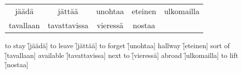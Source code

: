 \begin{center}
  \begin{tabular}{|c c c c c|}
    \hline
    jäädä & jättää & unohtaa & eteinen & ulkomailla \\
    tavallaan & tavattavissa & vieressä & nostaa & \\
    \hline
  \end{tabular}
\end{center}

\begin{questions}
  \begin{multicols}{3}
    \raggedcolumns
    \question to stay   \f[jäädä]
    \question to leave  \f[jättää]
    \question to forget \f[unohtaa]
    \question hallway   \f[eteinen]
    \question sort of   \f[tavallaan]
    \question available \f[tavattavissa]
    \question next to   \f[vieressä]
    \question abroad    \f[ulkomailla]
    \question to lift   \f[nostaa]
  \end{multicols}
\end{questions}
